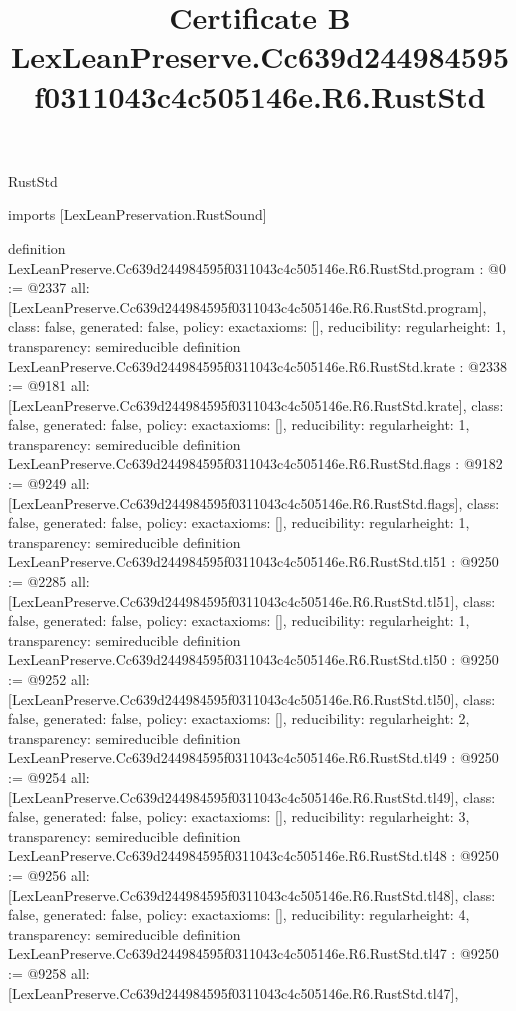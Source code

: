 \begin{lexlean}{RustStd}
\title{Certificate B LexLeanPreserve.Cc639d244984595f0311043c4c505146e.R6.RustStd}
\begin{coremodule}
imports [LexLeanPreservation.RustSound]

definition LexLeanPreserve.Cc639d244984595f0311043c4c505146e.R6.RustStd.program : @0 := @2337 {
  all: [LexLeanPreserve.Cc639d244984595f0311043c4c505146e.R6.RustStd.program],
  class: false,
  generated: false,
  policy: exact{axioms: []},
  reducibility: regular{height: 1},
  transparency: semireducible
}
definition LexLeanPreserve.Cc639d244984595f0311043c4c505146e.R6.RustStd.krate : @2338 := @9181 {
  all: [LexLeanPreserve.Cc639d244984595f0311043c4c505146e.R6.RustStd.krate],
  class: false,
  generated: false,
  policy: exact{axioms: []},
  reducibility: regular{height: 1},
  transparency: semireducible
}
definition LexLeanPreserve.Cc639d244984595f0311043c4c505146e.R6.RustStd.flags : @9182 := @9249 {
  all: [LexLeanPreserve.Cc639d244984595f0311043c4c505146e.R6.RustStd.flags],
  class: false,
  generated: false,
  policy: exact{axioms: []},
  reducibility: regular{height: 1},
  transparency: semireducible
}
definition LexLeanPreserve.Cc639d244984595f0311043c4c505146e.R6.RustStd.tl51 : @9250 := @2285 {
  all: [LexLeanPreserve.Cc639d244984595f0311043c4c505146e.R6.RustStd.tl51],
  class: false,
  generated: false,
  policy: exact{axioms: []},
  reducibility: regular{height: 1},
  transparency: semireducible
}
definition LexLeanPreserve.Cc639d244984595f0311043c4c505146e.R6.RustStd.tl50 : @9250 := @9252 {
  all: [LexLeanPreserve.Cc639d244984595f0311043c4c505146e.R6.RustStd.tl50],
  class: false,
  generated: false,
  policy: exact{axioms: []},
  reducibility: regular{height: 2},
  transparency: semireducible
}
definition LexLeanPreserve.Cc639d244984595f0311043c4c505146e.R6.RustStd.tl49 : @9250 := @9254 {
  all: [LexLeanPreserve.Cc639d244984595f0311043c4c505146e.R6.RustStd.tl49],
  class: false,
  generated: false,
  policy: exact{axioms: []},
  reducibility: regular{height: 3},
  transparency: semireducible
}
definition LexLeanPreserve.Cc639d244984595f0311043c4c505146e.R6.RustStd.tl48 : @9250 := @9256 {
  all: [LexLeanPreserve.Cc639d244984595f0311043c4c505146e.R6.RustStd.tl48],
  class: false,
  generated: false,
  policy: exact{axioms: []},
  reducibility: regular{height: 4},
  transparency: semireducible
}
definition LexLeanPreserve.Cc639d244984595f0311043c4c505146e.R6.RustStd.tl47 : @9250 := @9258 {
  all: [LexLeanPreserve.Cc639d244984595f0311043c4c505146e.R6.RustStd.tl47],
}
\end{coremodule}
\end{lexlean}
